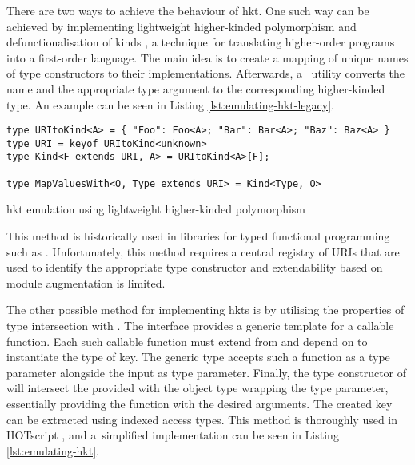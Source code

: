 There are two ways to achieve the behaviour of \acrshort{hkt}. One such way can be achieved by implementing lightweight higher-kinded polymorphism \cite{yallopLightweightHigherKindedPolymorphism2014} and defunctionalisation of kinds \cite{reynoldsDefinitionalInterpretersHigherorder1972}, a technique for translating higher-order programs into a first-order language. The main idea is to create a mapping of unique names of type constructors to their implementations. Afterwards, a~ utility converts the name and the appropriate type argument to the corresponding higher-kinded type. An example can be seen in Listing \ref{lst:emulating-hkt-legacy}.

\begin{listing}[ht]
  \begin{verbatim}
type URItoKind<A> = { "Foo": Foo<A>; "Bar": Bar<A>; "Baz": Baz<A> }
type URI = keyof URItoKind<unknown>
type Kind<F extends URI, A> = URItoKind<A>[F];

type MapValuesWith<O, Type extends URI> = Kind<Type, O>
\end{verbatim}
  \caption{\acrshort{hkt} emulation using lightweight higher-kinded polymorphism}\label{lst:emulating-hkt-legacy}
\end{listing}

This method is historically used in libraries for typed functional programming such as  \cite{GcantiFptsFunctional}. Unfortunately, this method requires a central registry of URIs that are used to identify the appropriate type constructor and extendability based on module augmentation is limited.

The other possible method for implementing \acrshort{hkt}s is by utilising the properties of type intersection with . The interface  provides a generic template for a callable function. Each such callable function must extend from  and depend on  to instantiate the type of  key. The  generic type accepts such a function as a type parameter  alongside the input as  type parameter. Finally, the type constructor of  will intersect the provided  with the object type wrapping the  type parameter, essentially providing the function with the desired arguments. The created  key can be extracted using indexed access types. This method is thoroughly used in HOTscript \cite{vergnaudHigherOrderTypeScriptHOTScript2023}, and a~simplified implementation can be seen in Listing \ref{lst:emulating-hkt}.

